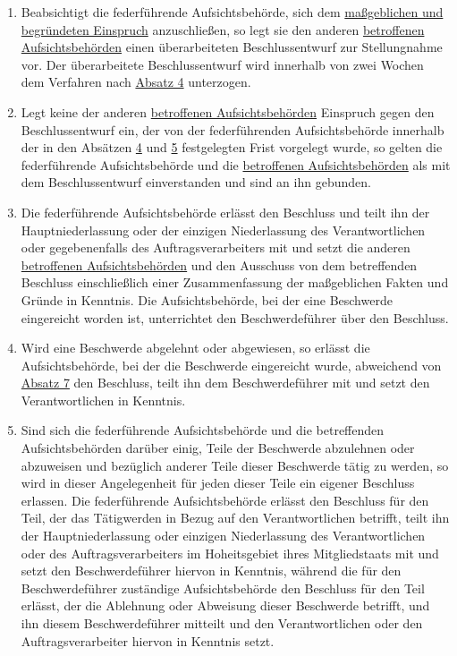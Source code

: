 \begin{enumerate}
  \item Beabsichtigt die federführende Aufsichtsbehörde, sich dem \hyperref[itm:04-27]{maßgeblichen und begründeten Einspruch} anzuschließen,
   so legt sie den anderen \hyperref[itm:04-22]{betroffenen Aufsichtsbehörden} einen überarbeiteten Beschlussentwurf zur Stellungnahme vor.
   Der überarbeitete Beschlussentwurf wird innerhalb von zwei Wochen dem Verfahren nach \hyperref[itm:60-4]{Absatz 4}
   unterzogen.
  \label{itm:60-5}

  \item Legt keine der anderen \hyperref[itm:04-22]{betroffenen Aufsichtsbehörden} Einspruch gegen den Beschlussentwurf ein, der von der
   federführenden Aufsichtsbehörde innerhalb der in den Absätzen \hyperref[itm:60-4]{4} und \hyperref[itm:60-5]
   {5} festgelegten Frist vorgelegt wurde, so gelten die federführende Aufsichtsbehörde und die \hyperref[itm:04-22]{betroffenen
   Aufsichtsbehörden} als mit dem Beschlussentwurf einverstanden und sind an ihn gebunden.
  \label{itm:60-6}

  \item Die federführende Aufsichtsbehörde erlässt den Beschluss und teilt ihn der Hauptniederlassung oder der einzigen
   Niederlassung des Verantwortlichen oder gegebenenfalls des Auftragsverarbeiters mit und setzt die anderen
   \hyperref[itm:04-22]{betroffenen Aufsichtsbehörden} und den Ausschuss von dem betreffenden Beschluss einschließlich einer Zusammenfassung
   der maßgeblichen Fakten und Gründe in Kenntnis. Die Aufsichtsbehörde, bei der eine Beschwerde eingereicht worden
   ist, unterrichtet den Beschwerdeführer über den Beschluss.
  \label{itm:60-7}

  \item Wird eine Beschwerde abgelehnt oder abgewiesen, so erlässt die Aufsichtsbehörde, bei der die Beschwerde
   eingereicht wurde, abweichend von \hyperref[itm:60-7]{Absatz 7} den Beschluss, teilt ihn dem Beschwerdeführer mit
   und setzt den Verantwortlichen in Kenntnis.
  \label{itm:60-8}

  \item Sind sich die federführende Aufsichtsbehörde und die betreffenden Aufsichtsbehörden darüber einig, Teile der
   Beschwerde abzulehnen oder abzuweisen und bezüglich anderer Teile dieser Beschwerde tätig zu werden, so wird in
   dieser Angelegenheit für jeden dieser Teile ein eigener Beschluss erlassen. Die federführende Aufsichtsbehörde
   erlässt den Beschluss für den Teil, der das Tätigwerden in Bezug auf den Verantwortlichen betrifft, teilt ihn der
   Hauptniederlassung oder einzigen Niederlassung des Verantwortlichen oder des Auftragsverarbeiters im Hoheitsgebiet
   ihres Mitgliedstaats mit und setzt den Beschwerdeführer hiervon in Kenntnis, während die für den Beschwerdeführer
   zuständige Aufsichtsbehörde den Beschluss für den Teil erlässt, der die Ablehnung oder Abweisung dieser Beschwerde
   betrifft, und ihn diesem Beschwerdeführer mitteilt und den Verantwortlichen oder den Auftragsverarbeiter hiervon in
   Kenntnis setzt.
  \label{itm:60-9}


\end{enumerate}
